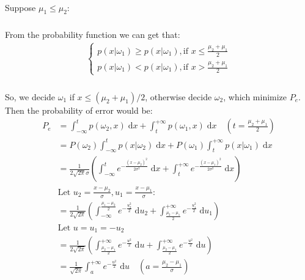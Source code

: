 \documentclass[]{article}
\begin{document}
        \paragraph{}Suppose $\mu_1 \leq \mu_2$:
            \subparagraph{}From the probability function we can get that: 
            \begin{align*}
                \begin{cases}
                    p(x|\omega_1) \geq p(x|\omega_1), \text{if } x \leq \frac{\mu_2 + \mu_1}{2} \\
                    p(x|\omega_1) < p(x|\omega_1), \text{if } x > \frac{\mu_2 + \mu_1}{2}
                \end{cases}
            \end{align*}
            \subparagraph{}So, we decide $\omega_1$ if $x \leq (\mu_2 + \mu_1)/2$, otherwise decide $\omega_2$, which minimize $P_e$. Then the probability of error would be:
            \begin{align*}
                P_e &= \int_{-\infty}^{t} p(\omega_2,x)  \; \mathrm{d}x + \int_{t}^{+\infty} p(\omega_1,x)  \; \mathrm{d}x \quad(t=\frac{\mu_2 + \mu_1}{2}) \\
                    &= P(\omega_2)\int_{-\infty}^{t} p(x|\omega_2)  \; \mathrm{d}x + P(\omega_1)\int_{t}^{+\infty} p(x|\omega_1)  \; \mathrm{d}x \\
                    &=\frac{1}{2\sqrt{2\pi}\sigma}(\int_{-\infty}^{t} e^{-\frac{(x-\mu_2)^2}{2\sigma^2}}  \; \mathrm{d}x +\int_{t}^{+\infty} e^{-\frac{(x-\mu_1)^2}{2\sigma^2}}   \; \mathrm{d}x )\\
                    &\text{Let }u_2=\frac{x-\mu_2}{\sigma},
                                u_1=\frac{x-\mu_1}{\sigma} :  \\
                    &=\frac{1}{2\sqrt{2\pi}}(\int_{-\infty}^{\frac{\mu_1 - \mu_2}{2}} e^{-\frac{u_2^2}{2}}  \; \mathrm{d}u_2 +\int_{\frac{\mu_2 - \mu_1}{2}}^{+\infty} e^{-\frac{u_1^2}{2}}   \; \mathrm{d}u_1 )   \\
                    &\text{Let }u=u_1=-u_2 \\ 
                    &=\frac{1}{2\sqrt{2\pi}}(\int_{\frac{\mu_2 - \mu_1}{2}}^{+\infty} e^{-\frac{u^2}{2}}   \; \mathrm{d}u  +\int_{\frac{\mu_2 - \mu_1}{2}}^{+\infty} e^{-\frac{u^2}{2}}   \; \mathrm{d}u ) \\
                    &=\frac{1}{\sqrt{2\pi}}\int_{a}^{+\infty} e^{-\frac{u^2}{2}}   \; \mathrm{d}u \quad (a=\frac{\mu_2 - \mu_1}{\sigma})
            \end{align*}
\end{document}

